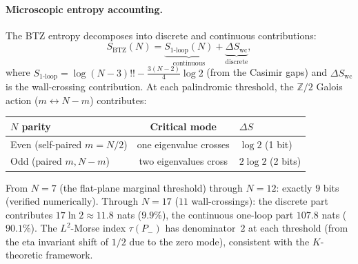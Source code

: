 \paragraph{Microscopic entropy accounting.}
The BTZ entropy decomposes into discrete and continuous contributions:
\begin{equation}\label{eq:btz-entropy-decomposition}
  S_{\mathrm{BTZ}}(N)
  = \underbrace{S_{\text{1-loop}}(N)}_{\text{continuous}}
  + \underbrace{\Delta S_{\text{wc}}}_{\text{discrete}},
\end{equation}
where $S_{\text{1-loop}} = \log(N{-}3)!! - \tfrac{3(N{-}2)}{4}\log 2$
(from the Casimir gaps) and $\Delta S_{\text{wc}}$ is the wall-crossing
contribution.
At each palindromic threshold, the $\mathbb{Z}/2$ Galois action
($m \leftrightarrow N{-}m$) contributes:
\begin{center}
\small
\begin{tabular}{lcl}
\toprule
$N$ parity & Critical mode & $\Delta S$ \\
\midrule
Even (self-paired $m = N/2$) & one eigenvalue crosses & $\log 2$ (1 bit) \\
Odd (paired $m, N{-}m$) & two eigenvalues cross & $2\log 2$ (2 bits) \\
\bottomrule
\end{tabular}
\end{center}
\noindent
From $N = 7$ (the flat-plane marginal threshold) through $N = 12$:
exactly $9$ bits (verified numerically).
Through $N = 17$ ($11$ wall-crossings): the discrete part contributes
$17\ln 2 \approx 11.8$ nats ($9.9\%$), the continuous one-loop part
$107.8$ nats ($90.1\%$).
The $L^2$-Morse index $\tau(P_-)$ has denominator~$2$
at each threshold (from the eta invariant shift of $1/2$
due to the zero mode), consistent with the $K$-theoretic framework.

